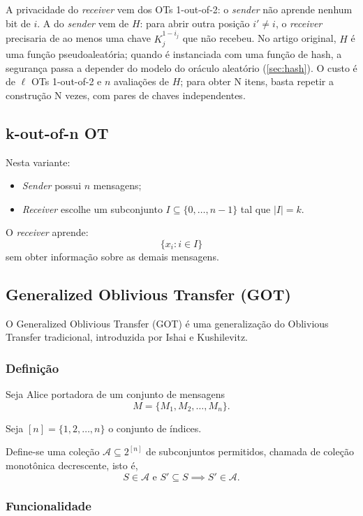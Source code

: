 A privacidade do \emph{receiver} vem dos OTs 1-out-of-2: o \emph{sender} não
aprende nenhum bit de $i$. A do \emph{sender} vem de $H$: para abrir outra
posição $i' \neq i$, o \emph{receiver} precisaria de ao menos uma chave
$K_j^{1-i_j}$ que não recebeu. No artigo original, $H$ é uma função
pseudoaleatória; quando é instanciada com uma função de hash, a segurança passa
a depender do modelo do oráculo aleatório (\autoref{sec:hash}). O custo é de
$\ell$ OTs 1-out-of-2 e $n$ avaliações de $H$; para obter N itens, basta
repetir a construção N vezes, com pares de chaves independentes.


\subsection{k-out-of-n OT}

Nesta variante:

\begin{itemize}
\item \emph{Sender} possui $n$ mensagens;
\item \emph{Receiver} escolhe um subconjunto $I \subseteq \{0, \ldots, n-1\}$
tal que $|I| = k$.
\end{itemize}

O \emph{receiver} aprende:
\[
\{x_i : i \in I\}
\]
sem obter informação sobre as demais mensagens.

\subsection{Generalized Oblivious Transfer (GOT)}

O Generalized Oblivious Transfer (GOT) é uma generalização do Oblivious
Transfer tradicional, introduzida por Ishai e Kushilevitz.
\cite{tassa2011}

\subsubsection{Definição}

Seja Alice portadora de um conjunto de mensagens
\[
M = \{M_1, M_2, \ldots, M_n\}.
\]

Seja $[n] = \{1, 2, \ldots, n\}$ o conjunto de índices.

Define-se uma coleção $\mathcal{A} \subseteq 2^{[n]}$ de subconjuntos
permitidos, chamada de coleção monotônica decrescente, isto é,
\[
S \in \mathcal{A} \text{ e } S' \subseteq S \implies S' \in \mathcal{A}.
\]

\subsubsection{Funcionalidade}

